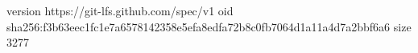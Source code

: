 version https://git-lfs.github.com/spec/v1
oid sha256:f3b63eec1fc1e7a6578142358e5efa8edfa72b8c0fb7064d1a11a4d7a2bbf6a6
size 3277
